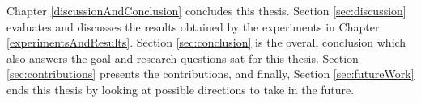 Chapter \ref{discussionAndConclusion} concludes this thesis. Section \ref{sec:discussion} evaluates and discusses the results obtained by the experiments in Chapter \ref{experimentsAndResults}. Section \ref{sec:conclusion} is the overall conclusion which also answers the goal and research questions sat for this thesis. Section \ref{sec:contributions} presents the contributions, and finally, Section \ref{sec:futureWork} ends this thesis by looking at possible directions to take in the future. 

